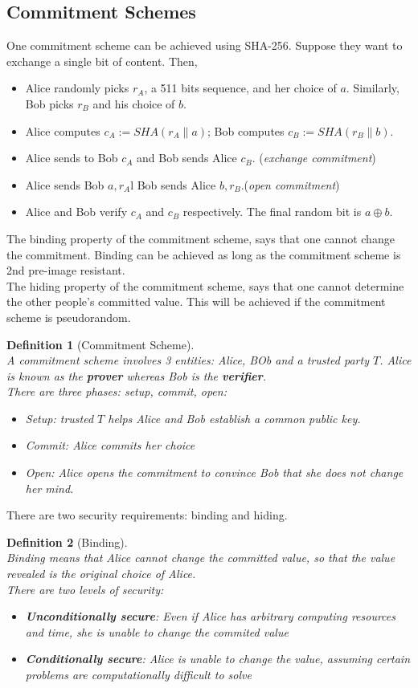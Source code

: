 \documentclass[12pt]{article}
\newtheorem{definition}{Definition}[section]
\theoremstyle{definition}
\begin{document}
\subsection{Commitment Schemes}
One commitment scheme can be achieved using SHA-256. Suppose they want to exchange a single bit of content. Then,
\begin{itemize}
  \item Alice randomly picks $r_A$, a 511 bits sequence, and her choice of $a$. Similarly, Bob picks $r_B$ and his choice of $b$.
  \item Alice computes $c_A:=SHA(r_A\| a)$; Bob computes $c_B:=SHA(r_B\| b)$.
  \item Alice sends to Bob $c_A$ and Bob sends Alice $c_B$. (\textit{exchange commitment})
  \item Alice sends Bob $a,r_A$l Bob sends Alice $b,r_B$.(\textit{open commitment})
  \item Alice and Bob verify $c_A$ and $c_B$ respectively. The final random bit is $a\oplus b$.
\end{itemize}
The binding property of the commitment scheme, says that one cannot change the commitment. Binding can be achieved as long as the commitment scheme is 2nd pre-image resistant.\\
The hiding property of the commitment scheme, says that one cannot determine the other people's committed value. This will be achieved if the commitment scheme is pseudorandom.\\
\begin{definition}[Commitment Scheme]
\hfill\\\normalfont A commitment scheme involves 3 entities: Alice, BOb and a trusted party $T$. Alice is known as the \textbf{prover} whereas Bob is the \textbf{verifier}.\\
There are three phases: setup, commit, open:
\begin{itemize}
  \item Setup: trusted $T$ helps Alice and Bob establish a common public key.
  \item Commit: Alice commits her choice
  \item Open: Alice opens the commitment to convince Bob that she does not change her mind.
\end{itemize}
\end{definition}
There are two security requirements: binding and hiding.
\begin{definition}[Binding]
\hfill\\\normalfont Binding means that Alice cannot change the committed value, so that the value revealed is the original choice of Alice.\\
There are two levels of security:
\begin{itemize}
  \item \textbf{Unconditionally secure}: Even if Alice has arbitrary computing resources and time, she is unable to change the commited value
  \item \textbf{Conditionally secure}: Alice is unable to change the value, assuming certain problems are computationally difficult to solve
\end{itemize}
\end{definition}
\end{document}

